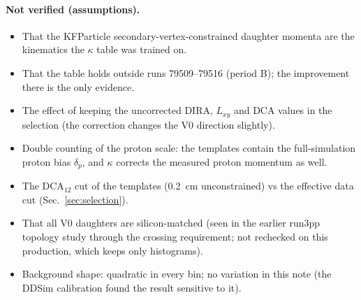 \paragraph{Not verified (assumptions).}
\begin{itemize}
\item That the KFParticle secondary-vertex-constrained daughter momenta are the kinematics the $\kappa$ table was trained on.
\item That the table holds outside runs 79509--79516 (period B); the improvement there is the only evidence.
\item The effect of keeping the uncorrected DIRA, $L_{xy}$ and DCA values in the selection (the correction changes the V0
  direction slightly).
\item Double counting of the proton scale: the templates contain the full-simulation proton bias $\delta_p$, and $\kappa$ corrects
  the measured proton momentum as well.
\item The DCA$_{12}$ cut of the templates (0.2~cm unconstrained) vs the effective data cut (Sec.~\ref{sec:selection}).
\item That all V0 daughters are silicon-matched (seen in the earlier run3pp topology study through the crossing requirement; not
  rechecked on this production, which keeps only histograms).
\item Background shape: quadratic in every bin; no variation in this note (the DDSim calibration found the \La{} result
  sensitive to it).
\end{itemize}
